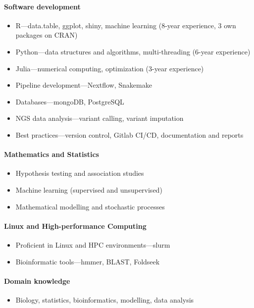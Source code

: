 \documentclass[
	DIV=15,
]{scrartcl}
\begin{document}
\paragraph{Software development}
\begin{itemize}
	\item R---data.table, ggplot, shiny, machine learning (8-year experience, 3 own packages on CRAN)
	\item Python---data structures and algorithms, multi-threading (6-year experience)
	\item Julia---numerical computing, optimization (3-year experience)
	\item Pipeline development---Nextflow, Snakemake
	\item Databases---mongoDB, PostgreSQL
	\item NGS data analysis---variant calling, variant imputation
	\item Best practices---version control, Gitlab CI/CD, documentation and reports
\end{itemize}

\paragraph{Mathematics and Statistics}
\begin{itemize}
	\item Hypothesis testing and association studies
	\item Machine learning (supervised and unsupervised)
	\item Mathematical modelling and stochastic processes
\end{itemize}

\paragraph{Linux and High-performance Computing}
\begin{itemize}
	\item Proficient in Linux and HPC environments---slurm
	\item Bioinformatic tools---hmmer, BLAST, Foldseek
\end{itemize}

\paragraph{Domain knowledge}
\begin{itemize}
	\item Biology, statistics, bioinformatics, modelling, data analysis
\end{itemize}
\end{document}
